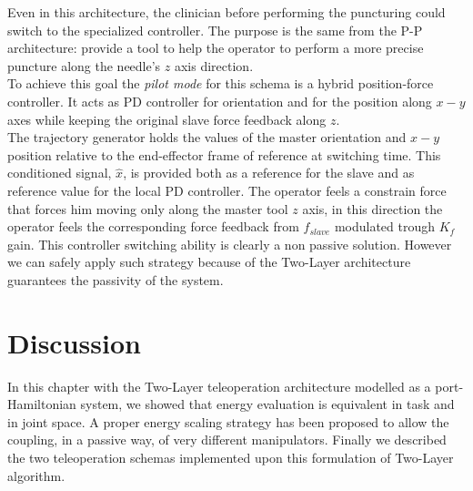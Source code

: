 Even in this architecture, the clinician before performing the puncturing could switch to the specialized controller.
The purpose is the same from the P-P architecture: provide a tool to help the operator to perform a more precise puncture along the needle's $z$ axis direction.\\
To achieve this goal the \textit{pilot mode} for this schema is a hybrid position-force controller.
It acts as PD controller for orientation and for the position along $x-y$ axes while keeping the original slave force feedback along $z$.\\
The trajectory generator holds the values of the master orientation and $x-y$ position relative to the end-effector frame of reference at switching time.
This conditioned signal, $\hat{x}$, is provided both as a reference for the slave and as reference value for the local PD controller. 
The operator feels a constrain force that forces him moving only along the master tool $z$ axis, in this direction the operator feels the corresponding force feedback from $f_{slave}$ modulated trough $K_{f}$ gain.
This controller switching ability is clearly a non passive solution. However we can safely apply such strategy because of the Two-Layer architecture guarantees the passivity of the system.

\section{Discussion}
In this chapter with the Two-Layer teleoperation architecture modelled as a port-Hamiltonian system,
we showed that energy evaluation is equivalent in task and in joint space.
A proper energy scaling strategy has been proposed to allow the coupling, in a passive way, of very different manipulators.
Finally we described the two teleoperation schemas implemented upon this formulation of Two-Layer algorithm.


\clearpage
\thispagestyle{empty}